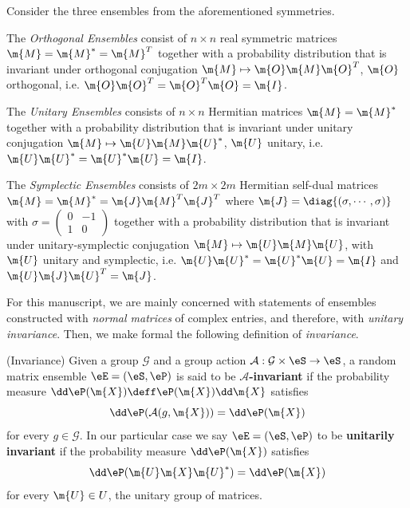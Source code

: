\begin{exemplo}
	Consider the three ensembles from the aforementioned symmetries. 
	
	The \textit{Orthogonal Ensembles} consist of $n \times n$ real symmetric matrices $\m{M} = \m{M}^* = \m{M}^T$ together with a probability distribution that is invariant under orthogonal conjugation $\m{M} \mapsto \m{O} \m{M} \m{O}^T$, $\m{O}$ orthogonal, i.e. $\m{O} \m{O}^T = \m{O}^T \m{O} = \m{I}$.  
	
	The \textit{Unitary Ensembles} consists of $n \times n$ Hermitian matrices $\m{M} = \m{M}^*$ together with a probability distribution that is invariant under unitary conjugation $\m{M} \mapsto \m{U} \m{M} \m{U}^*$, $\m{U}$ unitary, i.e. $\m{U} \m{U}^* = \m{U}^* \m{U} = \m{I}$.  
	
	The \textit{Symplectic Ensembles} consists of $2m \times 2m$ Hermitian self-dual matrices $\m{M} = \m{M}^* = \m{J} \m{M}^T \m{J}^T$ where $\m{J} = \diag{(\sigma, \cdots, \sigma)}$ with $\sigma = \begin{pmatrix} 0 & -1\\	1 & 0 \end{pmatrix}$ together with a probability distribution that is invariant under unitary-symplectic conjugation $\m{M} \mapsto \m{U} \m{M} \m{U}$, with $\m{U}$ unitary and symplectic, i.e. $\m{U} \m{U}^* = \m{U}^* \m{U} = \m{I}$ and $\m{U} \m{J} \m{U}^T = \m{J}$.
\end{exemplo}

For this manuscript, we are mainly concerned with statements of ensembles constructed with \textit{normal matrices} of complex entries, and therefore, with \textit{unitary invariance}. Then, we make formal the following definition of \textit{invariance}.

\begin{definicao} 	\label{Definition: Invariance}
	(Invariance)
	Given a group $\mathcal{G}$ and a group action $\mathcal{A}: \mathcal{G}\times \eS \rightarrow \eS$, a random matrix ensemble $\eE = (\eS, \eP)$ is said to be \textbf{$\mathcal{A}$-invariant} if the probability measure $\dd \eP(\m{X}) \deff \eP(\m{X}) \dd \m{X}$ satisfies
	\begin{equation}
		\dd \eP(\mathcal{A}(g, \m{X})) = \dd \eP(\m{X})
	\end{equation}
	for every $g \in \mathcal{G}$. In our particular case we say $\eE = (\eS, \eP)$ to be \textbf{unitarily invariant} if the probability measure $\dd \eP(\m{X})$ satisfies
	\begin{equation}
		\dd \eP(\m{U} \m{X} \m{U}^*) = \dd \eP(\m{X})
	\end{equation}
	for every $\m{U} \in U$, the unitary group of matrices. 
\end{definicao}

